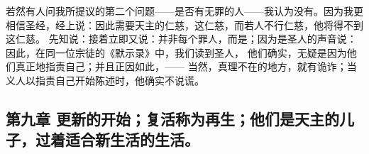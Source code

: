  若然有人问我所提议的第二个问题——是否有无罪的人——我认为没有。因为我更相信圣经，经上说：因此需要天主的仁慈，这仁慈，而若人不行仁慈，他将得不到这仁慈。 先知说：接着立即又说：并非每个罪人，而是；因为是圣人的声音说： 因此，在同一位宗徒的《默示录》中，我们读到圣人， 他们确实，无疑是因为他们真正地指责自己；并且正因如此，—— 当然，真理不在的地方，就有诡诈；当义人以指责自己开始陈述时，他确实不说谎。\par


\subsection{第九章 更新的开始；复活称为再生；他们是天主的儿子，过着适合新生活的生活。}

